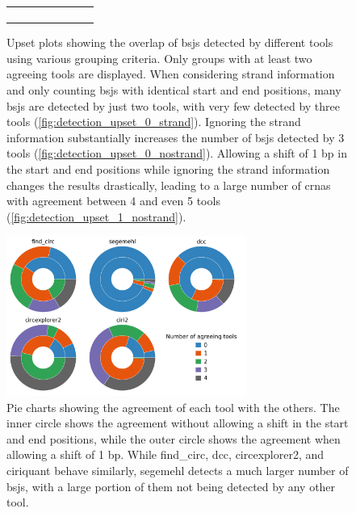 \begin{figure}[ht]
\begin{tabular}{cc}
{\begin{subfigure}{\textwidth}
                       \end{subfigure}}\end{tabular} \caption{Upset plots
        showing the overlap of
        \gls{bsj}s detected by different tools using various grouping criteria.
        Only groups with at least two agreeing tools are displayed.
        When considering strand information and only counting \gls{bsj}s with identical
        start and end positions, many \gls{bsj}s are detected by just two tools, with
        very few detected by three tools (\cref{fig:detection_upset_0_strand}).
        Ignoring the strand information substantially increases the number of
        \gls{bsj}s detected by 3 tools (\cref{fig:detection_upset_0_nostrand}).
        Allowing a shift of 1 bp in the start and end positions while ignoring the
        strand information changes the results drastically, leading to a large number
        of \gls{crna}s with agreement between 4 and even 5 tools
        (\cref{fig:detection_upset_1_nostrand}).
    }
    \label{fig:detection_upset}
\end{figure}

\begin{figure}[ht]
    \centering

    \includegraphics[width=0.7\textwidth]{chapters/4_results_and_discussion/figures/detection/pies.png}
    \caption{Pie charts showing the agreement of each tool with the others.
        The inner circle shows the agreement without allowing a shift in the start and
        end positions, while the outer circle shows the agreement when allowing a shift
        of 1 bp.
        While find\_circ, dcc, circexplorer2, and ciriquant behave similarly, segemehl
        detects a much larger number of \gls{bsj}s, with a large portion of them not
        being detected by any other tool.
    }
    \label{fig:detection_pies}
\end{figure}

